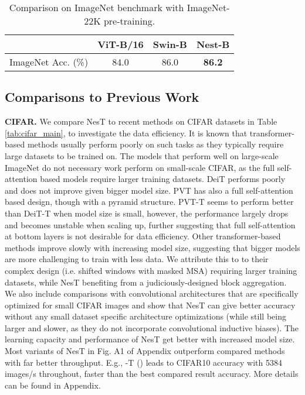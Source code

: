 \documentclass{article}
\newcommand{\topic}[1]{\noindent \textbf{#1}}
\newcommand{\OURS}{NesT\xspace}
\begin{document}
\begin{table}[t]
   \caption{Comparison on ImageNet benchmark with ImageNet-22K pre-training.} \vspace{-.1cm} \label{tab:imagenet22k} 
    \centering
    \small
    \begin{tabular}{l|c|c|c}
        \toprule
                                 &  ViT-B/16  & Swin-B  & Nest-B \\ \midrule
        ImageNet Acc. (\%)   &   84.0     &   86.0   & \textbf{86.2} \\\bottomrule
    \end{tabular} \vspace{-.3cm}
\end{table} 


\subsection{Comparisons to Previous Work}
\topic{CIFAR.}
We compare \OURS to recent methods on CIFAR datasets \cite{krizhevsky2009learning} in Table \ref{tab:cifar_main},  to investigate the data efficiency. 
It is known that transformer-based methods usually perform poorly on such tasks as they typically require large datasets to be trained on.
The models that perform well on large-scale ImageNet do not necessary work perform on small-scale CIFAR, as the full self-attention based models require larger training datasets. 
DeiT \cite{touvron2020training} performs poorly and does not improve given bigger model size. 
PVT \cite{wang2021pyramid} has also a full self-attention based design, though with a pyramid structure. 
PVT-T seems to perform better than DeiT-T when model size is small, however, the performance largely drops and becomes unstable when scaling up, further suggesting that full self-attention at bottom layers is not desirable for data efficiency. 
Other transformer-based methods improve slowly with increasing model size, suggesting that bigger models are more challenging to train with less data. 
We attribute this to to their complex design (i.e. shifted windows with masked MSA) requiring larger training datasets, while   \OURS benefiting from a judiciously-designed block aggregation.
We also include comparisons with convolutional architectures that are specifically optimized for small CIFAR images and show that \OURS can give better accuracy without any small dataset specific architecture optimizations (while still being larger and slower, as they do not incorporate convolutional inductive biases).
The learning capacity and performance of \OURS get better with increased model size. 
Most variants of \OURS in Fig. A1 of Appendix outperform compared methods with far better throughput. E.g., -T () leads to  CIFAR10 accuracy with 5384 images/s throughout,  faster than the best compared result  accuracy. More details can be found in Appendix.
\end{document}
